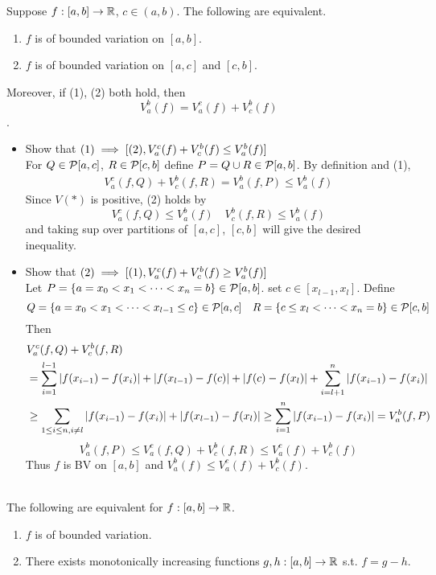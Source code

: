  Suppose $f:[a, b]\rightarrow\mathbb{R}$, $c\in (a, b)$. The following are equivalent.
\begin{enumerate}
	\item $f$ is of bounded variation on $[a, b]$.
	\item $f$ is of bounded variation on $[a, c]$ and $[c, b]$.
\end{enumerate}
Moreover, if (1), (2) both hold, then $$V_a^b(f) = V_a^c(f) + V_c^b(f)$$
\pf.
\begin{itemize}
	\item Show that $(1) \implies [(2), V_a^c(f) + V_c^b(f) \leq V_a^b(f)]$\\
	For $Q\in \mathcal{P}[a, c]$, $R\in \mathcal{P}[c, b]$ define $P  = Q\cup R\in \mathcal{P}[a, b]$. By definition and (1),
	$$ \begin{aligned}
		V_a^c (f, Q) + V_c^b(f, R) = V_a^b(f, P) \leq V_a^b(f)
	\end{aligned}$$
	Since $V(*)$ is positive, (2) holds by
	$$V_a^c(f, Q) \leq V_a^b(f) \quad V_c^b(f, R) \leq V_a^b(f)$$
	and taking sup over partitions of $[a, c]$, $[c, b]$ will give the desired inequality.
	\item Show that $(2) \implies [(1), V_a^c(f) + V_c^b(f) \geq V_a^b(f)]$\\
	Let $P = \{a = x_0 < x_1 < \cdots < x_n = b\}\in \mathcal{P}[a, b]$. set $c\in [x_{l-1}, x_l]$. Define
	$$Q = \{a = x_0 < x_1 < \cdots< x_{l-1} \leq c\}\in \mathcal{P}[a, c]  \quad R = \{c \leq x_{l} < \cdots< x_{n} = b\}\in \mathcal{P}[c, b]$$
	Then $$
	\begin{aligned}
		&V_a^c(f, Q) + V_c^b(f, R)\\&= \sum_{i=1}^{l-1} \left|f(x_{i-1}) - f(x_{i})\right| + \left|f(x_{l-1}) - f(c)\right| + \left|f(c) - f(x_l)\right| +\sum_{i=l+1}^{n} \left|f(x_{i-1}) - f(x_{i})\right|\\
		&\geq \sum_{1\leq i \leq n, i\neq l} \left|f(x_{i - 1}) - f(x_i)\right| + \left|f(x_{l-1}) - f(x_l)\right| \geq \sum_{i=1}^n \left|f(x_{i-1}) - f(x_i)\right| = V_a^b (f, P)
	\end{aligned}
	$$
	$$
	V_a^b(f, P)\leq V_a^c(f, Q) + V_c^b(f, R)\leq V_a^c(f) + V_c^b(f)
	$$
	Thus $f$ is BV on $[a, b]$ and $V_a^b(f)\leq V_a^c(f) + V_c^b(f)$.
\end{itemize}~\\
 The following are equivalent for $f:[a, b]\rightarrow\mathbb{R}$.
\begin{enumerate}
	\item $f$ is of bounded variation.
	\item There exists monotonically increasing functions $g, h:[a, b]\rightarrow\mathbb{R}$ s.t. $f = g-h$.
\end{enumerate}
